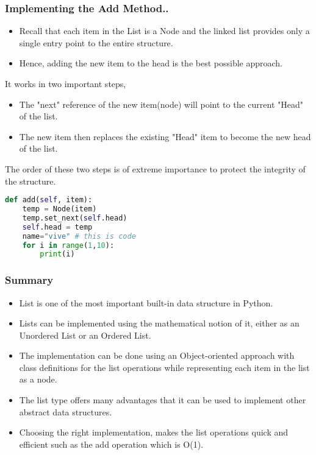 \documentclass{beamer}
\begin{document}
\begin{frame}
\frametitle{Implementing the Add Method..}
\begin{itemize}
\item Recall that each item in the List is a Node and the linked list provides only a single entry point to the entire structure.

\item Hence, adding the new item to the head is the best possible approach.

\end{itemize}
It works in two important steps,
\begin{itemize}

\item The "next" reference of the new item(node) will point to the current "Head" of the list.

\item The new item then replaces the existing "Head" item to become the new head of the list.

\end{itemize}

The order of these two steps is of extreme importance to protect the integrity of the structure. 
 
\end{frame}

\begin{frame}[fragile]

\begin{lstlisting}[language=Python, keywordstyle=\color{blue}]
def add(self, item):
	temp = Node(item)
	temp.set_next(self.head)
	self.head = temp
	name="vive" # this is code
	for i in range(1,10):
		print(i)
\end{lstlisting}
\end{frame}

\begin{frame}
\frametitle{Summary}
\begin{itemize}
\item List is one of the most important built-in data structure in Python.
\item Lists can be implemented using the mathematical notion of it, either as an Unordered List or an Ordered List.
\item The implementation can be done using an Object-oriented approach with class definitions for the list operations while representing each item in the list as a node.
\item The list type offers many advantages that it can be used to implement other abstract data structures.
\item Choosing the right implementation, makes the list operations quick and efficient such as the add operation which is O(1).
\end{itemize}
\end{frame}
\end{document}
